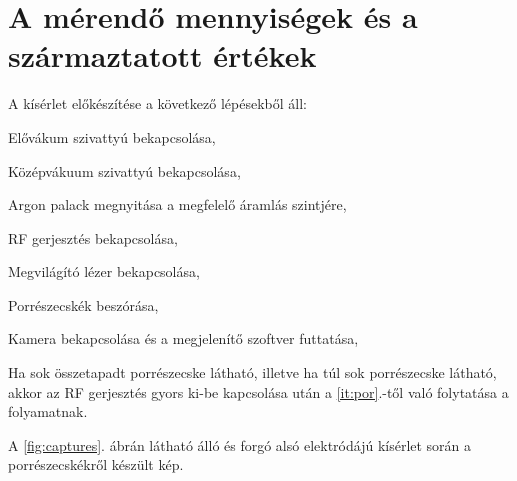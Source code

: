 \section{A mérendő mennyiségek és a származtatott értékek}
	A kísérlet előkészítése a következő lépésekből áll:
	\begin{enumerate*}
		\item Elővákum szivattyú bekapcsolása,
		\item Középvákuum szivattyú bekapcsolása,
		\item Argon palack megnyitása a megfelelő áramlás szintjére,
		\item RF gerjesztés bekapcsolása,
		\item Megvilágító lézer bekapcsolása,
		\item \label{it:por} Porrészecskék beszórása,
		\item Kamera bekapcsolása és a megjelenítő szoftver futtatása,
		\item Ha sok összetapadt porrészecske látható, illetve ha túl sok porrészecske látható, akkor
		az RF gerjesztés gyors ki-be kapcsolása után a \ref{it:por}.-től való folytatása a folyamatnak.
	\end{enumerate*}
	A \ref{fig:captures}. ábrán látható álló és forgó alsó elektródájú kísérlet során a
	porrészecskékről készült kép.
	

